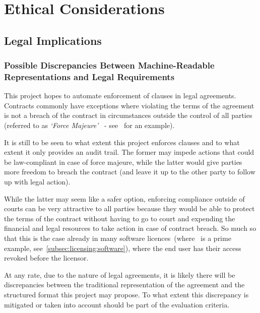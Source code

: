 
\chapter{Ethical Considerations}\label{ch:ethical}


\section{Legal Implications}\label{sec:legal-implications}

\subsection{Possible Discrepancies Between Machine-Readable Representations and Legal Requirements}
\label{subsec:legal-discrepancies}

This project hopes to automate enforcement of clauses in legal agreements.
Contracts commonly have exceptions where violating the terms of the agreement is not a breach of the
contract in circumstances outside the control of all parties (referred to as \textit{`Force
Majeure'}~\cite{forceMajeureDefinition} - see~\cite[]{jetbrainsEduLicence} for an
example).

It is still to be seen to what extent this project enforces clauses and to what extent it only
provides an audit trail.
The former may impede actions that could be law-compliant in case of force majeure, while the latter
would give parties more freedom to breach the contract (and leave it up to the other party to follow
up with legal action).

While the latter may seem like a safer option, enforcing compliance outside of courts can be very
attractive to all parties because they would be able to protect the terms of the contract without
having to go to court and expending the financial and legal resources to take action in case of
contract breach.
So much so that this is the case already in many software licences~(where~\cite{jetbrainsEduLicence}
is a prime example, see~\ref{subsec:licensing:software}), where the end user has their access
revoked before the licensor.

At any rate, due to the nature of legal agreements, it is likely there will be discrepancies
between the traditional representation of the agreement and the structured format this project
may propose.
To what extent this discrepancy is mitigated or taken into account should be part of the
evaluation criteria.

